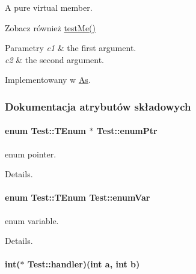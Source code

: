 A pure virtual member. 

\begin{DoxySeeAlso}{Zobacz również}
\hyperlink{classTest_af7115d71dda64654a7104c24f130e8d0}{test\-Me()} 
\end{DoxySeeAlso}

\begin{DoxyParams}{Parametry}
{\em c1} & the first argument. \\
\hline
{\em c2} & the second argument. \\
\hline
\end{DoxyParams}


Implementowany w \hyperlink{classAs_aade2dcd0ff4daf62cd578a6f1c11bdff}{As}.



\subsubsection{Dokumentacja atrybutów składowych}
\hypertarget{classTest_add1f72d205230e7bac3fcc70a65c1de2}{
\paragraph[{enum\-Ptr}]{\setlength{\rightskip}{0pt plus 5cm}enum {\bf Test\-::\-T\-Enum} 
       $\ast$ Test\-::enum\-Ptr}}\label{classTest_add1f72d205230e7bac3fcc70a65c1de2}


enum pointer. 

Details. \hypertarget{classTest_a0bd371828a36ad7ea83dfd07b2a672b5}{
\paragraph[{enum\-Var}]{\setlength{\rightskip}{0pt plus 5cm}enum {\bf Test\-::\-T\-Enum}
        Test\-::enum\-Var}}\label{classTest_a0bd371828a36ad7ea83dfd07b2a672b5}


enum variable. 

Details. \hypertarget{classTest_a8bef142724c4059c18f752e630a4d925}{
\paragraph[{handler}]{\setlength{\rightskip}{0pt plus 5cm}int($\ast$ Test\-::handler)(int a, int b)}}\label{classTest_a8bef142724c4059c18f752e630a4d925}


